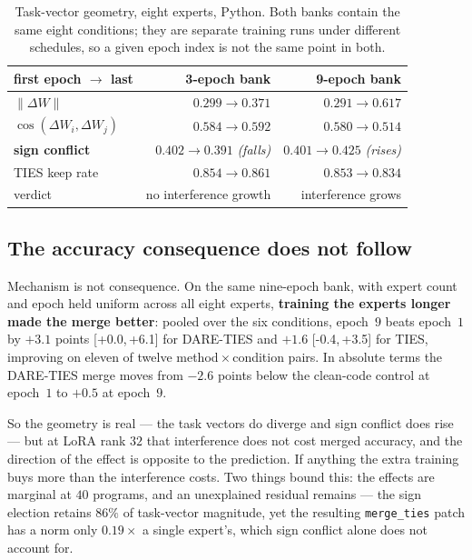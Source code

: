 \documentclass[sigconf,review,anonymous]{acmart}
\newcommand{\arm}[1]{\texttt{#1}}
\newcommand{\ci}[2]{{\small[#1,\,#2]}}
\begin{document}
\begin{table}[t]
\caption{Task-vector geometry, eight experts, Python. Both banks contain the same eight
conditions; they are separate training runs under different schedules, so a given epoch index is
not the same point in both.}
\label{tab:geometry}
\small
\begin{tabular}{@{}lrr@{}}
\toprule
first epoch $\to$ last & 3-epoch bank & 9-epoch bank \\
\midrule
$\|\Delta W\|$              & $0.299 \to 0.371$ & $0.291 \to 0.617$ \\
$\cos(\Delta W_i, \Delta W_j)$ & $0.584 \to 0.592$ & $0.580 \to 0.514$ \\
\textbf{sign conflict}      & $0.402 \to 0.391$ \emph{(falls)} & $0.401 \to 0.425$ \emph{(rises)} \\
TIES keep rate              & $0.854 \to 0.861$ & $0.853 \to 0.834$ \\
\midrule
verdict                     & no interference growth & interference grows \\
\bottomrule
\end{tabular}
\end{table}

\subsection{The accuracy consequence does not follow}

Mechanism is not consequence. On the same nine-epoch bank, with expert count and epoch held
uniform across all eight experts, \textbf{training the experts longer made the merge better}:
pooled over the six conditions, epoch~$9$ beats epoch~$1$ by $+3.1$ points \ci{+0.0}{+6.1} for
DARE-TIES and $+1.6$ \ci{-0.4}{+3.5} for TIES, improving on eleven of twelve
method\,$\times$\,condition pairs. In absolute terms the DARE-TIES merge moves from $-2.6$ points
below the clean-code control at epoch~$1$ to $+0.5$ at epoch~$9$.

So the geometry is real --- the task vectors do diverge and sign conflict does rise --- but at
LoRA rank $32$ that interference does not cost merged accuracy, and the direction of the effect
is opposite to the prediction. If anything the extra training buys more than the interference
costs. Two things bound this: the effects are marginal at $40$ programs, and an unexplained
residual remains --- the sign election retains $86\%$ of task-vector magnitude, yet the resulting
\arm{merge\_ties} patch has a norm only $0.19\times$ a single expert's, which sign conflict alone
does not account for.
\end{document}
